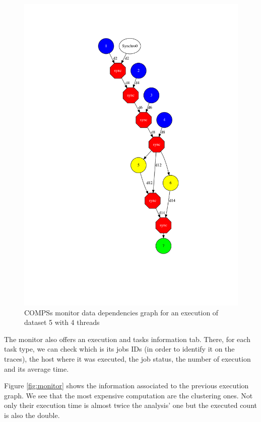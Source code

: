 \begin{figure}[h]
\includegraphics[height=\textheight]{img/main_01_completeGraph.png}
\caption{COMPSs monitor data dependencies graph for an execution of dataset 5 with 4 threads}
\label{par:graph}
\end{figure}

The monitor also offers an execution and tasks information tab. There, for each task type, we can check which is its jobs IDs (in order to identify it on the traces), the host where it was executed, the job status, the number of execution and its average time. 

Figure \ref{fig:monitor} shows the information associated to the previous execution graph. We see that the most expensive computation are the clustering ones. Not only their execution time is almost twice the analysis' one but the executed count is also the double.

